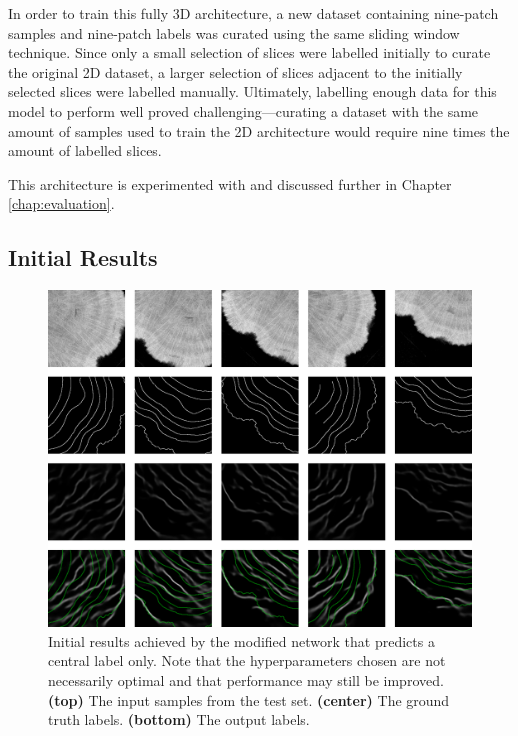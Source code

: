 In order to train this fully 3D architecture, a new dataset containing nine-patch samples and nine-patch labels was curated using the same sliding window technique. Since only a small selection of slices were labelled initially to curate the original 2D dataset, a larger selection of slices adjacent to the initially selected slices were labelled manually. Ultimately, labelling enough data for this model to perform well proved challenging---curating a dataset with the same amount of samples used to train the 2D architecture would require nine times the amount of labelled slices.

This architecture is experimented with and discussed further in Chapter \ref{chap:evaluation}.

\subsection{Initial Results}



\begin{figure}[t]
    \centering
    \includegraphics[width=1\textwidth]{images/initial-outputs-3D.png}
    \caption{Initial results achieved by the modified network that predicts a central label only. Note that the hyperparameters chosen are not necessarily optimal and that performance may still be improved. \textbf{(top)} The input samples from the test set. \textbf{(center)} The ground truth labels. \textbf{(bottom)} The output labels.}
    \label{fig:outputs2}
\end{figure}

